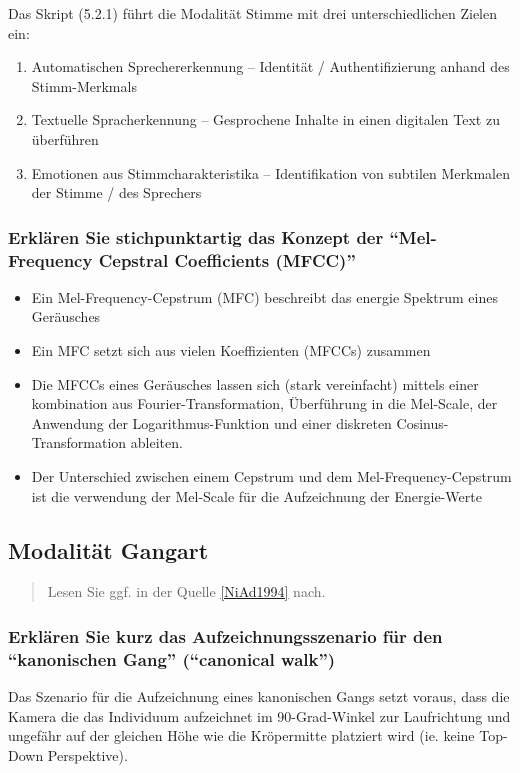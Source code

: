 \documentclass{article}
\newcommand{\annotation}[1]{
    \begin{quote}
    	\begin{textit}{#1}\end{textit}
    \end{quote}
}
\begin{document}
Das Skript (5.2.1) führt die Modalität Stimme mit drei unterschiedlichen Zielen ein:

\begin{enumerate}
	\item Automatischen Sprechererkennung – Identität / Authentifizierung anhand des Stimm-Merkmals
	\item Textuelle Spracherkennung – Gesprochene Inhalte in einen digitalen Text zu überführen
	\item Emotionen aus Stimmcharakteristika – Identifikation von subtilen Merkmalen der Stimme / des Sprechers
\end{enumerate}

\subsubsection{Erklären Sie stichpunktartig das Konzept der ``Mel-Frequency Cepstral Coefficients (MFCC)''}

\begin{itemize}
	\item Ein Mel-Frequency-Cepstrum (MFC) beschreibt das energie Spektrum eines Geräusches
	\item Ein MFC setzt sich aus vielen Koeffizienten (MFCCs) zusammen
	\item Die MFCCs eines Geräusches lassen sich (stark vereinfacht) mittels einer kombination aus Fourier-Transformation, Überführung in die Mel-Scale, der Anwendung der Logarithmus-Funktion und einer diskreten Cosinus-Transformation ableiten.
	\item Der Unterschied zwischen einem Cepstrum und dem Mel-Frequency-Cepstrum ist die verwendung der Mel-Scale für die Aufzeichnung der Energie-Werte
\end{itemize}

\subsection{Modalität Gangart}
\annotation{Lesen Sie ggf. in der Quelle \href{http://persci.mit.edu/pub_pdfs/niyogi_XYT.pdf}{[NiAd1994]} nach.}

\subsubsection{Erklären Sie kurz das Aufzeichnungsszenario für den ``kanonischen Gang'' (``canonical walk'')}

Das Szenario für die Aufzeichnung eines kanonischen Gangs setzt voraus, dass die Kamera die das Individuum aufzeichnet im
90-Grad-Winkel zur Laufrichtung und ungefähr auf der gleichen Höhe wie die Kröpermitte platziert wird (ie. keine Top-Down 
Perspektive).
\end{document}
